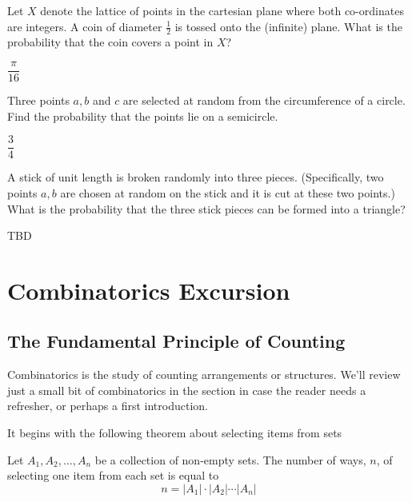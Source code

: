 \documentclass[../main.tex]{subfiles}
\begin{document}
\begin{example}
	Let $X$ denote the lattice of points in the cartesian 
	plane where both co-ordinates are integers. A coin
	of diameter $\frac12$ is tossed onto the (infinite) plane.
	What is the probability that the coin covers a point in $X$?
\end{example}

\begin{solution}[Answer]
	$\dfrac{\pi}{16}$
\end{solution}

\begin{example}
	Three points $a,b$ and $c$ are selected at random from the circumference of a circle. Find the probability that the
	points lie on a semicircle.
\end{example}

\begin{solution}[Answer]
	$\dfrac34$
\end{solution}

\begin{example}
	A stick of unit length is broken randomly into three pieces. (Specifically, two points $a,b$ are chosen at random on the
	stick and it is cut at these two points.) What is the probability
	that the three stick pieces can be formed into a triangle?
\end{example}

\begin{solution}
	TBD
\end{solution}
\section{Combinatorics Excursion}
\subsection{The Fundamental Principle of Counting}
Combinatorics is the study of counting arrangements or structures. We'll 
review just a small bit of combinatorics in the section in case the
reader needs a refresher, or perhaps a first introduction.

It begins with the following theorem about selecting items from sets
\begin{theorem}
	Let $A_1, A_2, \ldots, A_n$ be a collection of non-empty sets. The
	number of ways, $n$, of selecting one item from each set is equal to
	$$n = |A_1| \cdot |A_2| \cdots |A_n|$$
	\label{thm:fpc}
\end{theorem}
\end{document}
